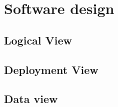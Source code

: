 \chapter{Software design}

\section{Logical View}


\clearpage

\section{Deployment View}


\clearpage

\section{Data view}

